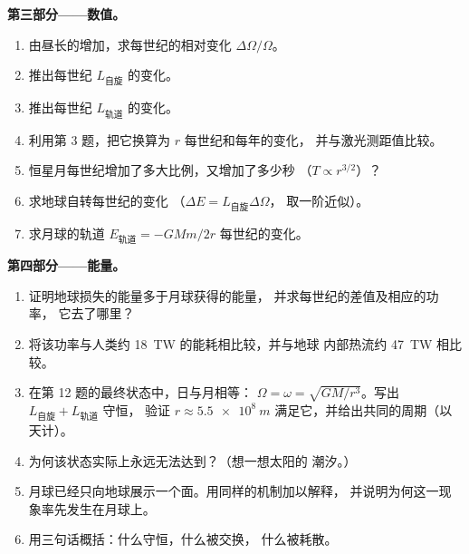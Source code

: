 \begin{problem}
\medskip
\noindent\textbf{第三部分——数值。}
\begin{enumerate}[resume]
  \item 由昼长的增加，求每世纪的相对变化
        $\Delta\Omega/\Omega$。
  \item 推出每世纪 $L_{\text{自旋}}$ 的变化。
  \item 推出每世纪 $L_{\text{轨道}}$ 的变化。
  \item 利用第 3 题，把它换算为 $r$ 每世纪和每年的变化，
        并与激光测距值比较。
  \item 恒星月每世纪增加了多大比例，又增加了多少秒
        （$T \propto r^{3/2}$）？
  \item 求地球自转每世纪的变化
        （$\Delta E = L_{\text{自旋}}\Delta\Omega$，
        取一阶近似）。
  \item 求月球的轨道
        $E_{\text{轨道}} = -GMm/2r$ 每世纪的变化。
\end{enumerate}

\medskip
\noindent\textbf{第四部分——能量。}
\begin{enumerate}[resume]
  \item 证明地球损失的能量多于月球获得的能量，
        并求每世纪的差值及相应的功率，
        它去了哪里？
  \item 将该功率与人类约
        \qty{18}{TW} 的能耗相比较，并与地球
        内部热流约 \qty{47}{TW} 相比较。
  \item 在第 12 题的最终状态中，日与月相等：
        $\Omega = \omega = \sqrt{GM/r^3}$。写出 $L_{\text{自旋}} + L_{\text{轨道}}$ 守恒，
        验证 $r \approx
        \qty{5.5e8}{m}$ 满足它，并给出共同的周期（以天计）。
  \item 为何该状态实际上永远无法达到？（想一想太阳的
        潮汐。）
  \item 月球已经只向地球展示一个面。用同样的机制加以解释，
        并说明为何这一现象率先发生在月球上。
  \item 用三句话概括：什么守恒，什么被交换，
        什么被耗散。
\end{enumerate}
\end{problem}
